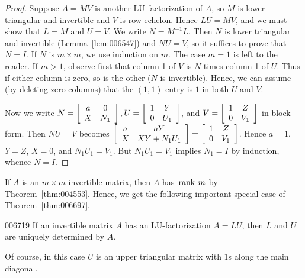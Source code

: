 \begin{proof}
Suppose $A = MV$ is another LU-factorization of $A$, so $M$ is lower triangular and invertible and $V$ is row-echelon. Hence $LU = MV$, and we must show that $L = M$ and $U = V$. We write $N = M^{-1}L$. Then $N$ is lower triangular and invertible (Lemma~\ref{lem:006547}) and $NU = V$, so it suffices to prove that $N = I$. If $N$ is $m \times m$, we use induction on $m$. The case $m = 1$ is left to the reader. If $m > 1$, observe first that column 1 of $V$ is $N$ times column 1 of $U$. Thus if either column is zero, so is the other ($N$ is invertible). Hence, we can assume (by deleting zero columns) that the $(1, 1)$-entry is $1$ in both $U$ and $V$.

Now we write $N = \left[ \begin{array}{cc}
a & 0 \\
X & N_{1}
\end{array} \right], U = \left[ \begin{array}{cc}
1 & Y \\
0 & U_{1}
\end{array} \right]$,
 and $V = \left[ \begin{array}{cc}
 1 & Z \\
 0 & V_{1}
 \end{array} \right]$
 in block form. Then $NU = V$ becomes $\left[ \begin{array}{cc}
a & aY \\
X & XY + N_{1}U_{1}
\end{array} \right] = \left[ \begin{array}{cc}
1 & Z \\
0 & V_{1}
\end{array} \right]$.
 Hence $a = 1$, $Y = Z$, $X = 0$, and $N_{1}U_{1} = V_{1}$. But $N_{1}U_{1} = V_{1}$ implies $N_{1} = I$ by induction, whence $N = I$.
\end{proof}

If $A$ is an $m \times m$ invertible matrix, then $A$ has $\thinspace\operatorname{rank \medspace}m$ by Theorem~\ref{thm:004553}. Hence, we get the following important special case of Theorem~\ref{thm:006697}.

\begin{corollary}{}{006719}
If an invertible matrix $A$ has an LU-factorization $A = LU$, then $L$ and $U$ are uniquely determined by $A$.
\end{corollary}

\noindent Of course, in this case $U$ is an upper triangular matrix with $1$s along the main diagonal.

